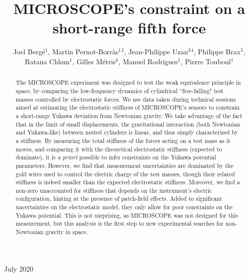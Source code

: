 \documentclass[12pt]{iopart}
\begin{document}
\title[Fifth force stiffness]{MICROSCOPE's constraint on a short-range fifth force}

\author{Joel Berg\'e$^1$, Martin Pernot-Borr\`as$^1$$^2$, Jean-Philippe Uzan$^3$$^4$, Philippe Brax$^5$, Ratana Chhun$^1$, Gilles M\'etris$^6$, Manuel Rodrigues$^1$, Pierre Touboul$^1$}

\address{$^1$ DPHY, ONERA, Universit\'e Paris Saclay, F-92322 Ch\^atillon, France}
\address{$^2$ Sorbonne Universit\'e, CNRS, Institut d'Astrophysique de Paris, IAP, F-75014 Paris, France}
\address{$^3$ CNRS, Institut d'Astrophysique de Paris, IAP, F-75014 Paris, France}
\address{$^4$ Institut Lagrange de Paris, 98 bis, Bd Arago, 75014 Paris, France}
\address{$^5$ Institut de Physique Th\'eorique, Universit\'e Paris-Saclay, CEA, CNRS, F-91191 Gif-sur-Yvette Cedex, France}
\address{$^6$ Universit\'e C\^ote d{'}Azur, Observatoire de la C\^ote d'Azur, CNRS, IRD, G\'eoazur, 250 avenue Albert Einstein, F-06560 Valbonne, France}
\vspace{10pt}
\begin{indented}
\item[]July 2020
\end{indented}

\begin{abstract}
The MICROSCOPE experiment was designed to test the weak equivalence principle in space, by comparing the low-frequency dynamics of cylindrical ``free-falling" test masses controlled by electrostatic forces. We use data taken during technical sessions aimed at estimating the electrostatic stiffness of MICROSCOPE's sensors to constrain a short-range Yukawa deviation from Newtonian gravity. We take advantage of the fact that in the limit of small displacements, the gravitational interaction (both Newtonian and Yukawa-like) between nested cylinders is linear, and thus simply characterised by a stiffness. By measuring the total stiffness of the forces acting on a test mass as it moves, and comparing it with the theoretical electrostatic stiffness (expected to dominate), it is {\it a priori} possible to infer constraints on the Yukawa potential parameters. However, we find that measurement uncertainties are dominated by the gold wires used to control the electric charge of the test masses, though their related stiffness is indeed smaller than the expected electrostatic stiffness. Moreover, we find a non-zero unaccounted for stiffness that depends on the instrument's electric configuration, hinting at the presence of patch-field effects. Added to significant uncertainties on the electrostatic model, they only allow for poor constraints on the Yukawa potential. This is not surprising, as MICROSCOPE was not designed for this measurement, but this analysis is the first step to new experimental searches for non-Newtonian gravity in space.
\end{abstract}
\end{document}
